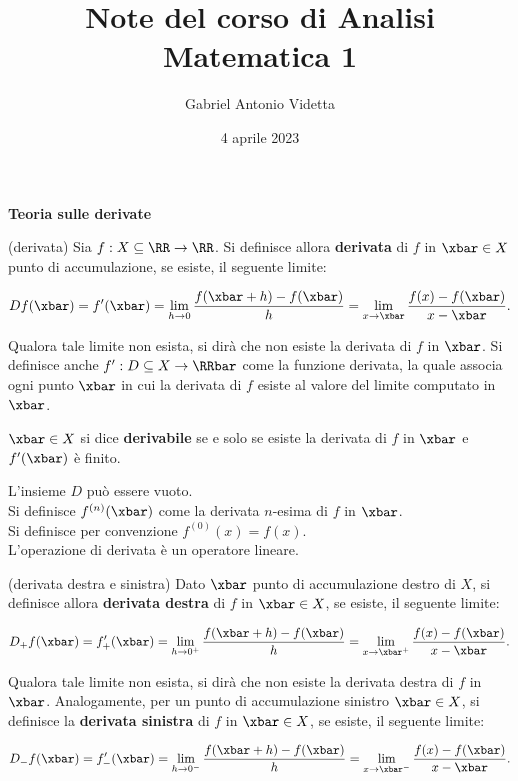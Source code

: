 \documentclass[11pt]{article}
\title{\textbf{Note del corso di Analisi Matematica 1}}
\author{Gabriel Antonio Videtta}
\date{4 aprile 2023}
\begin{document}
	
	\maketitle
	
	\wip
	
	\begin{center}
		\Large \textbf{Teoria sulle derivate}
	\end{center}

	\begin{definition} (derivata)
		Sia $f : X \subseteq \RR \to \RR$. Si definisce allora \textbf{derivata}
		di $f$ in $\xbar \in X$ punto di accumulazione, se esiste, il seguente limite:
		
		\[Df(\xbar) = f'(\xbar) = \lim_{h \to 0} \frac{f(\xbar + h) - f(\xbar)}{h} = \lim_{x \to \xbar} \frac{f(x) - f(\xbar)}{x - \xbar}.\]
		
		\vskip 0.05in
		
		Qualora tale limite non esista, si dirà che non esiste la derivata
		di $f$ in $\xbar$. Si definisce anche $f' : D \subseteq X \to \RRbar$ come la funzione derivata,
		la quale associa ogni punto $\xbar$ in cui la derivata di $f$ esiste al
		valore del limite computato in $\xbar$.
	\end{definition}
	
	\begin{definition}
		$\xbar \in X$ si dice \textbf{derivabile} se e solo se esiste la
		derivata di $f$ in $\xbar$ e $f'(\xbar)$ è finito.
	\end{definition}
	
	\begin{remark}\nl
		\li L'insieme $D$ può essere vuoto. \\
		\li Si definisce $f^{(n)}(\xbar)$ come la derivata $n$-esima
		di $f$ in $\xbar$. \\
		\li Si definisce per convenzione $f^{(0)}(x) = f(x)$. \\
		\li L'operazione di derivata è un operatore lineare. \\
	\end{remark}

	\begin{definition} (derivata destra e sinistra)
		Dato $\xbar$ punto di accumulazione destro di $X$, si definisce
		allora \textbf{derivata destra} di $f$ in $\xbar \in X$, se
		esiste, il seguente limite:
		
		\[D_+ f(\xbar) = f_+'(\xbar) = \lim_{h \to 0^+} \frac{f(\xbar + h) - f(\xbar)}{h} = \lim_{x \to \xbar^+} \frac{f(x) - f(\xbar)}{x - \xbar}.\]
		
		\vskip 0.05in
		
		Qualora tale limite non esista, si dirà che non esiste la derivata destra di $f$ in $\xbar$. Analogamente, per un punto di accumulazione sinistro $\xbar \in X$, si definisce
		la \textbf{derivata sinistra} di $f$ in $\xbar \in X$, se esiste, il seguente
		limite:
		
		\[D_- f(\xbar) = f_-'(\xbar) = \lim_{h \to 0^-} \frac{f(\xbar + h) - f(\xbar)}{h} = \lim_{x \to \xbar^-} \frac{f(x) - f(\xbar)}{x - \xbar}.\]
	\end{definition}
\end{document}
